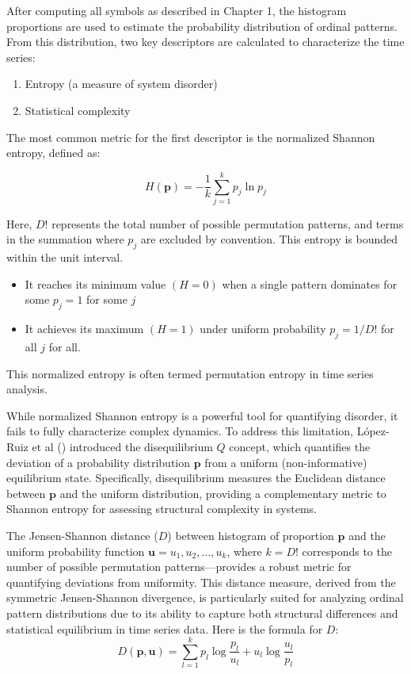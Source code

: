 After computing all symbols as described in Chapter 1, the histogram proportions are used to estimate the probability distribution of ordinal patterns. From this distribution, two key descriptors are calculated to characterize the time series:
\begin{enumerate}
\item Entropy (a measure of system disorder)

\item Statistical complexity
\end{enumerate}
The most common metric for the first descriptor is the normalized Shannon entropy, defined as:

\begin{equation}
	H(\mathbf{p})=-\dfrac{1}{k}\sum^{k}_{j=1}p_j \ln{p_j}
\end{equation}

Here, $D!$ represents the total number of possible permutation patterns, and terms in the summation where $p_j$ are excluded by convention. This entropy is bounded within the unit interval.

\begin{itemize}
\item It reaches its minimum value $(H=0)$ when a single pattern dominates  for some $p_j=1$ for some $j$ 
\item It achieves its maximum $(H=1)$ under uniform probability $p_j=1/D!$ for all $j$ for all. 
\end{itemize}

This normalized entropy is often termed permutation entropy in time series analysis. 

While normalized Shannon entropy is a powerful tool for quantifying disorder, it fails to fully characterize complex dynamics. To address this limitation, López-Ruiz et al (\cite{lopez1995statistical}) introduced the disequilibrium $Q$ concept, which quantifies the deviation of a probability distribution $\mathbf{p}$ from a uniform (non-informative) equilibrium state. Specifically, disequilibrium measures the Euclidean distance between $\mathbf{p}$ and the uniform distribution, providing a complementary metric to Shannon entropy for assessing structural complexity in systems.

The Jensen-Shannon distance ($D$) between histogram of proportion $\mathbf{p}$ and the uniform probability function $\mathbf{u}=u_1,u_2,\dots, u_k$, where $k=D!$ corresponds to the number of possible permutation patterns—provides a robust metric for quantifying deviations from uniformity. This distance measure, derived from the symmetric Jensen-Shannon divergence, is particularly suited for analyzing ordinal pattern distributions due to its ability to capture both structural differences and statistical equilibrium in time series data.
Here is the formula for $D$:
\begin{equation}
	D(\mathbf{p,u})=\sum^k_{l=1} p_l\log\dfrac{p_l}{u_l}+u_l\log\dfrac{u_l}{p_l}
\end{equation}

